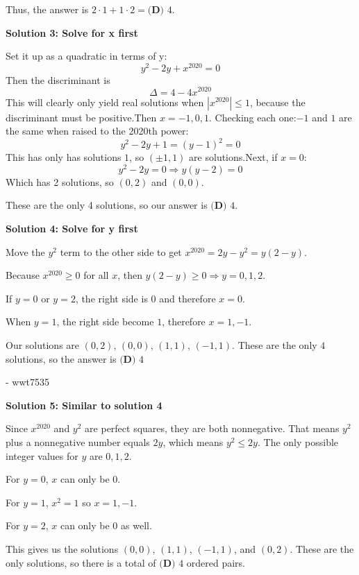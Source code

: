 \begin{enumerate}
 Thus, the answer is $2 \cdot 1 + 1 \cdot 2 = \boxed{\textbf{(D) }4}$.

 



\textbf{Solution 3: Solve for x first}

Set it up as a quadratic in terms of y:
 \[y^2-2y+x^{2020}=0\]Then the discriminant is
 \[\Delta = 4-4x^{2020}\]This will clearly only yield real solutions when $|x^{2020}| \leq 1$, because the discriminant must be positive.Then $x=-1,0,1$. Checking each one:$-1$ and $1$ are the same when raised to the 2020th power:
 \[y^2-2y+1=(y-1)^2=0\]This has only has solutions $1$, so $(\pm 1,1)$ are solutions.Next, if $x=0$:
 \[y^2-2y=0 \Rightarrow y(y-2)=0\]Which has 2 solutions, so $(0,2)$ and $(0,0)$.

 These are the only 4 solutions, so our answer is $\boxed{\textbf{(D) } 4}$.

 



\textbf{Solution 4: Solve for y first}

Move the $y^2$ term to the other side to get $x^{2020}=2y-y^2 = y(2-y)$. 

 Because $x^{2020} \geq 0$ for all $x$, then $y(2-y) \geq 0 \Rightarrow y = 0,1,2$. 

 If $y=0$ or $y=2$, the right side is $0$ and therefore $x=0$. 

 When $y=1$, the right side become $1$, therefore $x=1,-1$. 

 Our solutions are $(0,2)$, $(0,0)$, $(1,1)$, $(-1,1)$. These are the only $4$ solutions, so the answer is $\boxed{\textbf{(D) } 4}$ 

 - wwt7535

 



\textbf{Solution 5: Similar to solution 4}

Since $x^{2020}$ and $y^2$ are perfect squares, they are both nonnegative. That means $y^2$ plus a nonnegative number equals $2y$, which means $y^2 \leq 2y.$ The only possible integer values for $y$ are $0, 1, 2$.

 For $y=0$, $x$ can only be $0$.

 For $y=1$, $x^2=1$ so $x=1, -1$.

 For $y=2$, $x$ can only be $0$ as well.

 This gives us the solutions $(0, 0)$, $(1, 1)$, $(-1, 1)$, and $(0, 2)$. These are the only solutions, so there is a total of $\boxed{\textbf{(D) } 4}$ ordered pairs.


\end{enumerate}
